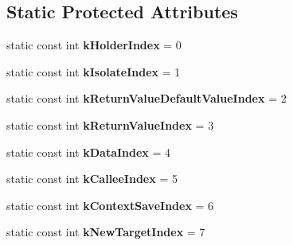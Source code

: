 \subsection*{Static Protected Attributes}
\begin{DoxyCompactItemize}
\item 
static const int {\bfseries k\+Holder\+Index} = 0\hypertarget{classv8_1_1_function_callback_info_a073824921daf8600fb9c00c50ee8ef0c}{}\label{classv8_1_1_function_callback_info_a073824921daf8600fb9c00c50ee8ef0c}

\item 
static const int {\bfseries k\+Isolate\+Index} = 1\hypertarget{classv8_1_1_function_callback_info_a0e2fbe5a323276263c848ea8050a34eb}{}\label{classv8_1_1_function_callback_info_a0e2fbe5a323276263c848ea8050a34eb}

\item 
static const int {\bfseries k\+Return\+Value\+Default\+Value\+Index} = 2\hypertarget{classv8_1_1_function_callback_info_a0b32b5613fe2f0cd139d9dffc0916d09}{}\label{classv8_1_1_function_callback_info_a0b32b5613fe2f0cd139d9dffc0916d09}

\item 
static const int {\bfseries k\+Return\+Value\+Index} = 3\hypertarget{classv8_1_1_function_callback_info_abb339e201184ebe2502a1202d54201ca}{}\label{classv8_1_1_function_callback_info_abb339e201184ebe2502a1202d54201ca}

\item 
static const int {\bfseries k\+Data\+Index} = 4\hypertarget{classv8_1_1_function_callback_info_a152c34c5b2f8c55d04d6d541bf8a4544}{}\label{classv8_1_1_function_callback_info_a152c34c5b2f8c55d04d6d541bf8a4544}

\item 
static const int {\bfseries k\+Callee\+Index} = 5\hypertarget{classv8_1_1_function_callback_info_a08a4ef2004bfaa468df347d357849ca6}{}\label{classv8_1_1_function_callback_info_a08a4ef2004bfaa468df347d357849ca6}

\item 
static const int {\bfseries k\+Context\+Save\+Index} = 6\hypertarget{classv8_1_1_function_callback_info_a9c0fdcc74eea99d8fa74460086e3b80a}{}\label{classv8_1_1_function_callback_info_a9c0fdcc74eea99d8fa74460086e3b80a}

\item 
static const int {\bfseries k\+New\+Target\+Index} = 7\hypertarget{classv8_1_1_function_callback_info_a23e70f4737b7e205dc91b972d75fbd9c}{}\label{classv8_1_1_function_callback_info_a23e70f4737b7e205dc91b972d75fbd9c}

\end{DoxyCompactItemize}
